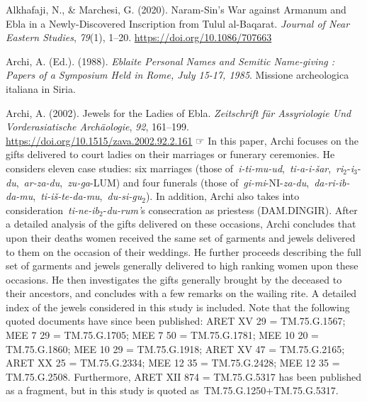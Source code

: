 \documentclass[
]{book}
\newlength{\cslhangindent}
\newlength{\cslentryspacingunit} %
\newenvironment{CSLReferences}[2] %
 {%
  \setlength{\parindent}{0pt}
  \ifodd #1
  \let\oldpar\par
  \def\par{\hangindent=\cslhangindent\oldpar}
  \fi
  \setlength{\parskip}{#2\cslentryspacingunit}
 }%
 {}
\newcommand{\CSLBlock}[1]{#1\hfill\break}
\begin{document}
\hypertarget{refs}{}
\begin{CSLReferences}{1}{0}
\leavevmode{}%
Alkhafaji, N., \& Marchesi, G. (2020). Naram-{Sin}'s {War} against {Armanum} and {Ebla} in a {Newly-Discovered Inscription} from {Tulul} al-{Baqarat}. \emph{Journal of Near Eastern Studies}, \emph{79}(1), 1--20. \url{https://doi.org/10.1086/707663}

\leavevmode{}%
Archi, A. (Ed.). (1988). \emph{Eblaite {Personal Names} and {Semitic Name-giving} : {Papers} of a {Symposium Held} in {Rome}, {July} 15-17, 1985}. Missione archeologica italiana in Siria.

\leavevmode{}%
Archi, A. (2002). Jewels for the {Ladies} of {Ebla}. \emph{Zeitschrift f{ü}r Assyriologie Und Vorderasiatische Arch{ä}ologie}, \emph{92}, 161--199. \url{https://doi.org/10.1515/zava.2002.92.2.161}
\CSLBlock{\newline☞ In this paper, Archi focuses on the gifts delivered to court ladies on their marriages or funerary ceremonies. He considers eleven case studies: six marriages (those of~\emph{i-ti-mu-ud},~\emph{ti-a-i-{š}ar},~\emph{ri}{\(_2\)}-\emph{i}{\(_3\)}-\emph{du},~\emph{ar-za-du},~\emph{zu-ga}-LUM) and four funerals (those of~\emph{gi-mi}-NI-\emph{za-du},~\emph{da-ri-ib-da-mu},~\emph{ti-i{š}-te-da-mu},~\emph{du-si-gu}{\(_2\)}). In addition, Archi also takes into consideration~\emph{ti-ne-ib}{\(_2\)}-\emph{du-rum'}s consecration as priestess (DAM.DINGIR). After a detailed analysis of the gifts delivered on these occasions, Archi concludes that upon their deaths women received the same set of garments and jewels delivered to them on the occasion of their weddings. He further proceeds describing the full set of garments and jewels generally delivered to high ranking women upon these occasions. He then investigates the gifts generally brought by the deceased to their ancestors, and concludes with a few remarks on the wailing rite. A detailed index of the jewels considered in this study is included. Note that the following quoted documents have since been published: ARET XV 29 = TM.75.G.1567; MEE 7 29 = TM.75.G.1705; MEE 7 50 = TM.75.G.1781; MEE 10 20 = TM.75.G.1860; MEE 10 29 = TM.75.G.1918; ARET XV 47 = TM.75.G.2165; ARET XX 25 = TM.75.G.2334; MEE 12 35 = TM.75.G.2428; MEE 12 35 = TM.75.G.2508. Furthermore, ARET XII 874 = TM.75.G.5317 has been published as a fragment, but in this study is quoted as~TM.75.G.1250+TM.75.G.5317.}


\end{CSLReferences}
\end{document}
